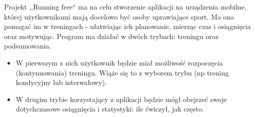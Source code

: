 \nopagebreak
Projekt ,,Running free`` ma na celu stworzenie aplikacji na urządzenia mobilne, której użytkownikami mają docelowo być osoby uprawiające sport. Ma ona pomagać im w treningach - ułatwiając ich planowanie, mierząc czas i osiągnięcia oraz motywując. 
Program ma działać w dwóch trybach: treningu oraz podsumowania.
\begin{itemize}
\item W pierwszym z nich użytkownik będzie miał możliwość rozpoczęcia (kontynuowania) treningu. Wiąże się to z wyborem trybu (np trening kondycyjny lub interwałowy).
\item W drugim trybie korzystający z aplikacji będzie mógł obejrzeć swoje dotychczasowe osiągnięcia i statystyki: ile ćwiczył, jak często. 
\end{itemize}
